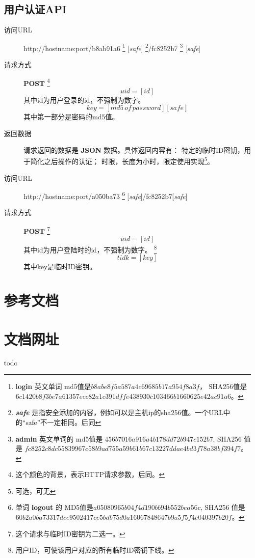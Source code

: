 \documentclass[UTF8]{ctexart}
\begin{document}
    \subsection{用户认证API}
    \begin{description}
        \item[访问URL] http://hostname:port/b8ab91a6
        \footnote{
            \textbf{login} 英文单词 md5值是$b8abe8f5a587a4c69685b17a954f8a3f$，
            SHA256值是 
            $6c1420b8f3be7a61357ecc82a1c391dffe438930c103466b1660625e42ac91a6$。
        }
        [\textit{safe}]
        \footnote{\textit{\textbf{safe}} 是指安全添加的内容，例如可以是主机ip的sha256值。一个URL中的“safe”不一定相同。后同}/fc8252b7
        \footnote{
            \textbf{admin} 英文单词的
            md5值是 $456b7016a916a4b178dd72b947c152b7 $,
            SHA256 值是
            $fc8252c8dc55839967c58b9ad755a59b61b67c13227ddae4bd3f78a38bf394f7$。
        }
        [\textit{safe}]
        \item[请求方式] \textbf{POST}
        \footnote{这个颜色的背景，表示HTTP请求参数，后同。}
        $$uid=[id]$$
        其中id为用户登录的id，不强制为数字。
         $$key=[md5\, of\, password][safe]$$
         其中第一部分是密码的md5值。
        \item[返回数据]请求返回的数据是 \textbf{JSON} 数据。具体返回内容有：
        特定的临时ID密钥，用于简化之后操作的认证；
        时限，长度为小时，限定使用实现\footnote{可选，可无}。
    \end{description}
    \begin{description}
        \item[访问URL] http://hostname:port/a050ba73
        \footnote{
            单词 \textbf{logout} 的
            MD5值是$a05080965b04f4d190bb94b552bea56c $,
            SHA256 值是
            $60b2a0ba73317dce9502417ce5bdb75d0a16067848647b9a5f5f4e040397b20f$。
        }
        [\textit{safe}]/fc8252b7[\textit{safe}]
        \item[请求方式] \textbf{POST}
        \footnote{这个请求与临时ID密钥为二选一。}
        $$uid=[id]$$
        其中id为用户登陆时的id，不强制为数字。
        \footnote{用户ID，可使该用户对应的所有临时ID密钥下线。}
        $$tidk=[key]$$
        其中key是临时ID密钥。
        \end{description}
    \begin{appendices}
    \section{参考文档}
    \section{文档网址}
    todo 
    \end{appendices}
    
\end{document}
